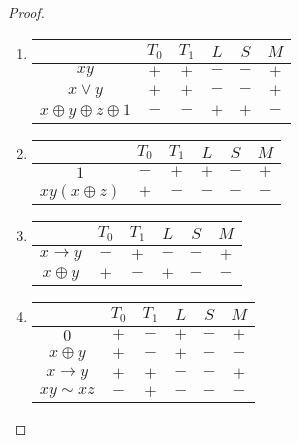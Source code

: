 \begin{proof}
  \begin{enumerate}[1)]
  \item
    \begin{tabular}[b]{|c|c|c|c|c|c|}
      \hline
      & $T_0$ & $T_1$ & $L$ & $S$ & $M$\\
      \hline
      $xy$ & $+$ & $+$ & $-$ & $-$ & $+$\\
      \hline
      $x\vee y$ & $+$ & $+$ & $-$ & $-$ & $+$\\
      \hline
      $x\oplus y\oplus z\oplus 1$ & $-$ & $-$ & $+$ & $+$ & $-$ \\
      \hline
    \end{tabular}
  \item
    \begin{tabular}[b]{|c|c|c|c|c|c|}
      \hline
      & $T_0$ & $T_1$ & $L$ & $S$ & $M$\\
      \hline
      $1$ & $-$ & $+$ & $+$ & $-$ & $+$\\
      \hline
      $xy(x\oplus z)$ & $+$ & $-$ & $-$ & $-$ & $-$\\
      \hline
    \end{tabular}
  \item
    \begin{tabular}[b]{|c|c|c|c|c|c|}
      \hline
      & $T_0$ & $T_1$ & $L$ & $S$ & $M$\\
      \hline
      $x\rightarrow y$ & $-$ & $+$ & $-$ & $-$ & $+$\\
      \hline
      $x\oplus y$ & $+$ & $-$ & $+$ & $-$ & $-$\\
      \hline
    \end{tabular}
  \item
    \begin{tabular}[b]{|c|c|c|c|c|c|}
      \hline
      & $T_0$ & $T_1$ & $L$ & $S$ & $M$\\
      \hline
      $0$ & $+$ & $-$ & $+$ & $-$ & $+$\\
      \hline
      $x\oplus y$ & $+$ & $-$ & $+$ & $-$ & $-$\\
      \hline
      $x\rightarrow y$ & $+$ & $+$ & $-$ & $-$ & $+$\\
      \hline
      $xy \sim xz$ & $-$ & $+$ & $-$ & $-$ & $-$\\
      \hline
    \end{tabular}
  \end{enumerate}
\end{proof}


